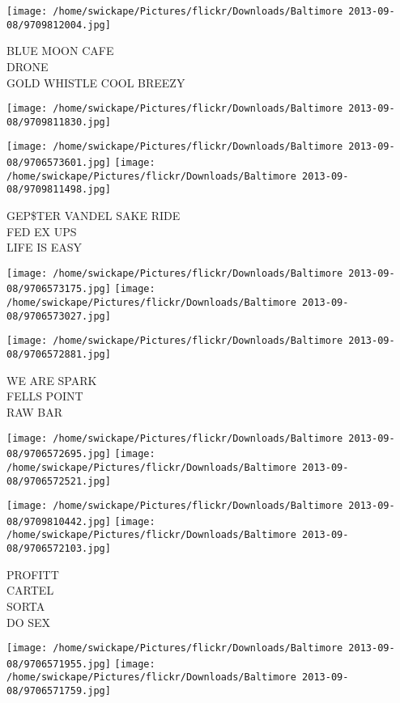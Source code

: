 \documentclass[10pt,letterpaper]{article}
\begin{document}
\texttt{[image: /home/swickape/Pictures/flickr/Downloads/Baltimore 2013-09-08/9709812004.jpg]}

BLUE MOON CAFE\\
DRONE\\
GOLD WHISTLE COOL BREEZY
\pagebreak

\texttt{[image: /home/swickape/Pictures/flickr/Downloads/Baltimore 2013-09-08/9709811830.jpg]}

\vspace{0.25in}
\texttt{[image: /home/swickape/Pictures/flickr/Downloads/Baltimore 2013-09-08/9706573601.jpg]}
\texttt{[image: /home/swickape/Pictures/flickr/Downloads/Baltimore 2013-09-08/9709811498.jpg]}

GEP\$TER VANDEL SAKE RIDE\\
FED EX UPS\\
LIFE IS EASY
\pagebreak

\texttt{[image: /home/swickape/Pictures/flickr/Downloads/Baltimore 2013-09-08/9706573175.jpg]}
\texttt{[image: /home/swickape/Pictures/flickr/Downloads/Baltimore 2013-09-08/9706573027.jpg]}

\vspace{0.25in}
\texttt{[image: /home/swickape/Pictures/flickr/Downloads/Baltimore 2013-09-08/9706572881.jpg]}

WE ARE SPARK\\
FELLS POINT\\
RAW BAR
\pagebreak

\texttt{[image: /home/swickape/Pictures/flickr/Downloads/Baltimore 2013-09-08/9706572695.jpg]}
\texttt{[image: /home/swickape/Pictures/flickr/Downloads/Baltimore 2013-09-08/9706572521.jpg]}

\texttt{[image: /home/swickape/Pictures/flickr/Downloads/Baltimore 2013-09-08/9709810442.jpg]}
\texttt{[image: /home/swickape/Pictures/flickr/Downloads/Baltimore 2013-09-08/9706572103.jpg]}

PROFITT\\
CARTEL\\
SORTA\\
DO SEX
\pagebreak

\texttt{[image: /home/swickape/Pictures/flickr/Downloads/Baltimore 2013-09-08/9706571955.jpg]}
\texttt{[image: /home/swickape/Pictures/flickr/Downloads/Baltimore 2013-09-08/9706571759.jpg]}
\end{document}
